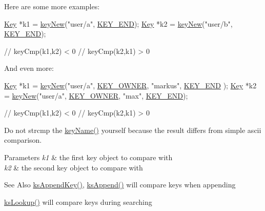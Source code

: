 \begin{DoxyCodeInclude}
\end{DoxyCodeInclude}
 Here are some more examples\-: 
\begin{DoxyCode}
\hyperlink{classkdb_1_1Key_a5679f5cae63caddd64a60388b9cc77fa}{Key} *k1 = \hyperlink{group__key_gad23c65b44bf48d773759e1f9a4d43b89}{keyNew}(\textcolor{stringliteral}{"user/a"}, \hyperlink{group__key_gga91fb3178848bd682000958089abbaf40aa8adb6fcb92dec58fb19410eacfdd403}{KEY\_END});
\hyperlink{classkdb_1_1Key_a5679f5cae63caddd64a60388b9cc77fa}{Key} *k2 = \hyperlink{group__key_gad23c65b44bf48d773759e1f9a4d43b89}{keyNew}(\textcolor{stringliteral}{"user/b"}, \hyperlink{group__key_gga91fb3178848bd682000958089abbaf40aa8adb6fcb92dec58fb19410eacfdd403}{KEY\_END});

\textcolor{comment}{// keyCmp(k1,k2) < 0}
\textcolor{comment}{// keyCmp(k2,k1) > 0}
\end{DoxyCode}


And even more\-: 
\begin{DoxyCode}
\hyperlink{classkdb_1_1Key_a5679f5cae63caddd64a60388b9cc77fa}{Key} *k1 = \hyperlink{group__key_gad23c65b44bf48d773759e1f9a4d43b89}{keyNew}(\textcolor{stringliteral}{"user/a"}, \hyperlink{group__key_gga91fb3178848bd682000958089abbaf40a77ca60362fa8daca8d5347db4385068b}{KEY\_OWNER}, \textcolor{stringliteral}{"markus"}, \hyperlink{group__key_gga91fb3178848bd682000958089abbaf40aa8adb6fcb92dec58fb19410eacfdd403}{KEY\_END}
      );
\hyperlink{classkdb_1_1Key_a5679f5cae63caddd64a60388b9cc77fa}{Key} *k2 = \hyperlink{group__key_gad23c65b44bf48d773759e1f9a4d43b89}{keyNew}(\textcolor{stringliteral}{"user/a"}, \hyperlink{group__key_gga91fb3178848bd682000958089abbaf40a77ca60362fa8daca8d5347db4385068b}{KEY\_OWNER}, \textcolor{stringliteral}{"max"}, \hyperlink{group__key_gga91fb3178848bd682000958089abbaf40aa8adb6fcb92dec58fb19410eacfdd403}{KEY\_END});

\textcolor{comment}{// keyCmp(k1,k2) < 0}
\textcolor{comment}{// keyCmp(k2,k1) > 0}
\end{DoxyCode}


Do not strcmp the \hyperlink{group__keyname_ga8e805c726a60da921d3736cda7813513}{key\-Name()} yourself because the result differs from simple ascii comparison.


\begin{DoxyParams}{Parameters}
{\em k1} & the first key object to compare with \\
\hline
{\em k2} & the second key object to compare with\\
\hline
\end{DoxyParams}
\begin{DoxySeeAlso}{See Also}
\hyperlink{group__keyset_gaa5a1d467a4d71041edce68ea7748ce45}{ks\-Append\-Key()}, \hyperlink{group__keyset_ga21eb9c3a14a604ee3a8bdc779232e7b7}{ks\-Append()} will compare keys when appending 

\hyperlink{group__keyset_gaa34fc43a081e6b01e4120daa6c112004}{ks\-Lookup()} will compare keys during searching 
\end{DoxySeeAlso}



